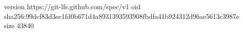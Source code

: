version https://git-lfs.github.com/spec/v1
oid sha256:99dcf83d3ee1fd0b671d4a8931393593908fbdfa41b924312d96ae5613c3987e
size 43840
